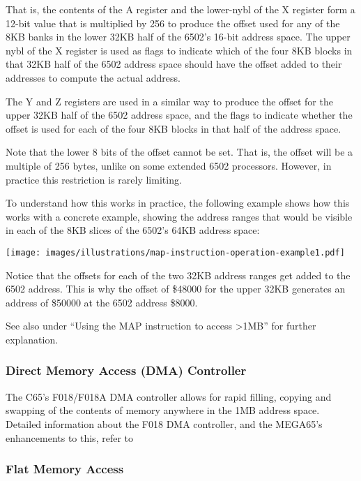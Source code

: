 That is, the contents of the A register and the lower-nybl of the X register form a 12-bit value
that is multiplied by 256 to produce the offset used for any of the 8KB banks in the lower 32KB half of the 6502's 16-bit address
space.  The upper nybl of the X register is used as flags to indicate which of the four 8KB blocks in that 32KB half of the
6502 address space should have the offset added to their addresses to compute the actual address.

The Y and Z registers are used in a similar way to produce the offset for the upper 32KB half of the 6502 address space, and the
flags to indicate whether the offset is used for each of the four 8KB blocks in that half of the address space.

Note that the lower 8 bits of the offset cannot be set. That is, the offset will be a multiple of 256
bytes, unlike on some extended 6502 processors.  However, in practice this restriction is rarely
limiting.

To understand how this works in practice, the following example shows how this works with a concrete
example, showing the address ranges that would be visible in each of the 8KB slices of the 6502's
64KB address space:

\begin{center}
  \texttt{[image: images/illustrations/map-instruction-operation-example1.pdf]}
\end{center}

Notice that the offsets for each of the two 32KB address ranges get added to the 6502 address.
This is why the offset of \$48000 for the upper 32KB generates an address of \$50000 at the 6502
address \$8000.

See also under ``Using the MAP instruction to access >1MB'' for further explanation.

\subsubsection{Direct Memory Access (DMA) Controller}

The C65's F018/F018A DMA controller allows for rapid filling, copying and swapping of the contents of memory
anywhere in the 1MB address space. Detailed information about the F018 DMA controller, and the MEGA65's
enhancements to this, refer to 

\subsubsection{Flat Memory Access}

